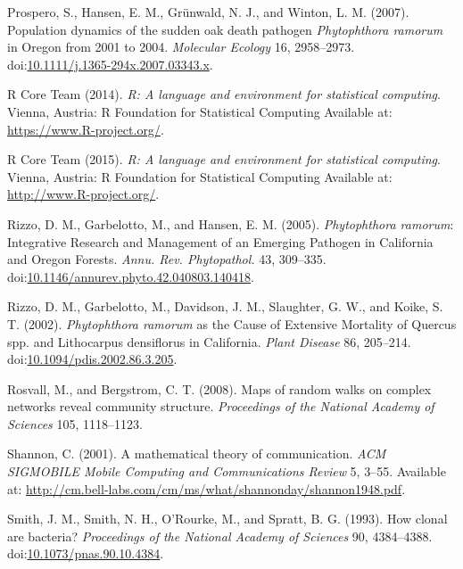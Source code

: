 \documentclass[double,12pt]{beavtex}
\begin{document}
  \hypertarget{ref-prospero2007population}{}
  Prospero, S., Hansen, E. M., Grünwald, N. J., and Winton, L. M. (2007).
  Population dynamics of the sudden oak death pathogen \emph{Phytophthora
  ramorum} in Oregon from 2001 to 2004. \emph{Molecular Ecology} 16,
  2958--2973.
  doi:\href{https://doi.org/10.1111/j.1365-294x.2007.03343.x}{10.1111/j.1365-294x.2007.03343.x}.
  
  \hypertarget{ref-R2014}{}
  R Core Team (2014). \emph{R: A language and environment for statistical
  computing}. Vienna, Austria: R Foundation for Statistical Computing
  Available at: \url{https://www.R-project.org/}.
  
  \hypertarget{ref-R}{}
  R Core Team (2015). \emph{R: A language and environment for statistical
  computing}. Vienna, Austria: R Foundation for Statistical Computing
  Available at: \url{http://www.R-project.org/}.
  
  \hypertarget{ref-rizzo2005phytophthora}{}
  Rizzo, D. M., Garbelotto, M., and Hansen, E. M. (2005).
  \emph{Phytophthora ramorum}: Integrative Research and Management of an
  Emerging Pathogen in California and Oregon Forests. \emph{Annu. Rev.
  Phytopathol.} 43, 309--335.
  doi:\href{https://doi.org/10.1146/annurev.phyto.42.040803.140418}{10.1146/annurev.phyto.42.040803.140418}.
  
  \hypertarget{ref-rizzo2002phytophthora}{}
  Rizzo, D. M., Garbelotto, M., Davidson, J. M., Slaughter, G. W., and
  Koike, S. T. (2002). \emph{Phytophthora ramorum} as the Cause of
  Extensive Mortality of Quercus spp. and Lithocarpus densiflorus in
  California. \emph{Plant Disease} 86, 205--214.
  doi:\href{https://doi.org/10.1094/pdis.2002.86.3.205}{10.1094/pdis.2002.86.3.205}.
  
  \hypertarget{ref-rosvall2008maps}{}
  Rosvall, M., and Bergstrom, C. T. (2008). Maps of random walks on
  complex networks reveal community structure. \emph{Proceedings of the
  National Academy of Sciences} 105, 1118--1123.
  
  \hypertarget{ref-shannon2001mathematical}{}
  Shannon, C. (2001). A mathematical theory of communication. \emph{ACM
  SIGMOBILE Mobile Computing and Communications Review} 5, 3--55.
  Available at:
  \url{http://cm.bell-labs.com/cm/ms/what/shannonday/shannon1948.pdf}.
  
  \hypertarget{ref-smith1993how}{}
  Smith, J. M., Smith, N. H., O'Rourke, M., and Spratt, B. G. (1993). How
  clonal are bacteria? \emph{Proceedings of the National Academy of
  Sciences} 90, 4384--4388.
  doi:\href{https://doi.org/10.1073/pnas.90.10.4384}{10.1073/pnas.90.10.4384}.
  
\end{document}
